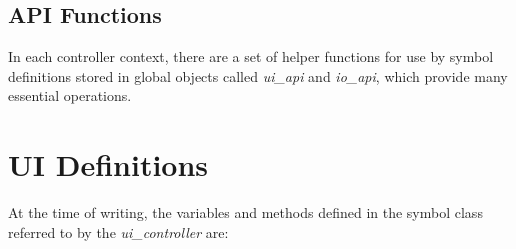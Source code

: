 \documentclass{article}
\def\uicontroller{\textit{ui\_controller}\xspace}
\def\uiapi{\textit{ui\_api}\xspace}
\def\ioapi{\textit{io\_api}\xspace}
\begin{document}
\subsection*{API Functions}\label{sec:api_functions}

In each controller context, there are a set of helper functions for use by symbol definitions stored in global objects called \uiapi and \ioapi, which provide many essential operations.

\section{UI Definitions}\label{sec:ui_callbacks}

At the time of writing, the variables and methods defined in the symbol class referred to by the \uicontroller are:
\end{document}
